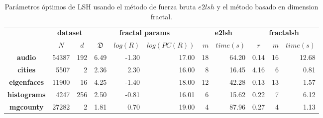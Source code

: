 \begin{table}[!t]
\caption{Parámetros óptimos  de LSH usando el método de fuerza bruta $e2lsh$ y el método basado en dimension fractal.}
\label{table:lshparams}
\centering
\begin{footnotesize}
\begin{tabular}{c|r|r|r|r|r|r|r|r|r|r|}
    \cline{2-11}
    & \multicolumn{ 2}{|c|}{{\bf dataset}} & \multicolumn{ 3}{|c|}{{\bf fractal params}} & \multicolumn{ 2}{|c|}{{\bf e2lsh}} & \multicolumn{ 3}{|c|}{{\bf fractalsh}}  \\
    \cline{2-11}
    & \multicolumn{1}{c|}{$N$}    & \multicolumn{1}{c|}{$d$} & \multicolumn{1}{c|}{$\mathfrak{D}$}    & $log(R)$ & $log(PC(R))$   & $m$ & \multicolumn{1}{c|}{$time(s)$}    & \multicolumn{1}{c|}{$r$}  & $m$ & \multicolumn{1}{c|}{$time(s)$} \\
    \hline
\multicolumn{1}{|c|}{\bf audio}                 & 54387                 & 192      & 6.49     & -1.30      & 17.00       & \cellcolor[HTML]{f2f2f2}18                        & \cellcolor[HTML]{f2f2f2}64.20     & 0.14  & \cellcolor[HTML]{DFDFDF}16                    & \cellcolor[HTML]{DFDFDF}12.68                   \\
\multicolumn{1}{|c|}{\bf cities}                & 5507                  & 2        & 2.36     & 2.30       & 16.00       & \cellcolor[HTML]{f2f2f2}8                         & \cellcolor[HTML]{f2f2f2}16.45      & 4.16  & \cellcolor[HTML]{DFDFDF}6                     & \cellcolor[HTML]{DFDFDF}0.81                    \\
\multicolumn{1}{|c|}{\bf eigenfaces}            & 11900                 & 16       & 4.25     & -1.40      & 18.00       & \cellcolor[HTML]{f2f2f2}12                        & \cellcolor[HTML]{f2f2f2}42.28      & 0.13  & \cellcolor[HTML]{DFDFDF}13                    & \cellcolor[HTML]{DFDFDF}1.57                    \\
\multicolumn{1}{|c|}{\bf histograms}            & 4247                  & 256      & 2.50     & -0.81      & 16.01       & \cellcolor[HTML]{f2f2f2}6                         & \cellcolor[HTML]{f2f2f2}15.62      & 0.22  & \cellcolor[HTML]{DFDFDF}7                     & \cellcolor[HTML]{DFDFDF}6.12                    \\
\multicolumn{1}{|c|}{\bf mgcounty}              & 27282                 & 2        & 1.81     & 0.70       & 19.00       & \cellcolor[HTML]{f2f2f2}4                         & \cellcolor[HTML]{f2f2f2}87.96      & 0.27  & \cellcolor[HTML]{DFDFDF}4                     & \cellcolor[HTML]{DFDFDF}1.13                     \\

\end{tabular}
\end{footnotesize}
\end{table}
